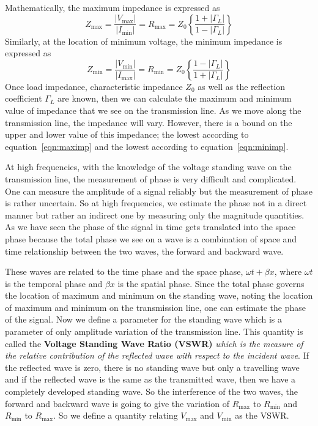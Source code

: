 Mathematically, the maximum impedance is expressed as
\begin{dmath}
Z_{\max} = \frac{|V_{\max}|}{|I_{\min}|} 
= R_{\max}
= Z_0\left\{\frac{1+|\Gamma_L|}{1-|\Gamma_L|}\right\}
\label{eqn:maximp}
\end{dmath}
Similarly, at the location of minimum voltage, the minimum impedance is expressed as
\begin{dmath}
Z_{\min}=\frac{|V_{\min}|}{|I_{\max}|} 
= R_{\min}=Z_0\left\{\frac{1-|\Gamma_L|}{1+|\Gamma_L|} \right\}
\label{eqn:minimp}
\end{dmath}
Once load impedance, characteristic impedance $Z_0$ as well as the reflection coefficient $\Gamma_L$ are known, then we can calculate the maximum and minimum value of impedance that we see on the transmission line. As we move along the transmission line, the impedance will vary. However, there is a bound on the upper and lower value of this impedance; the lowest according to equation~\ref{eqn:maximp} and the lowest according to equation~\ref{eqn:minimp}.

At high frequencies, with the knowledge of the voltage standing wave on the transmission line, the measurement of phase is very difficult and complicated. One can measure the amplitude of a signal reliably but the measurement of phase is rather uncertain. So at high frequencies, we estimate the phase not in a direct manner but rather an indirect one by measuring only the magnitude quantities. As we have seen the phase of the signal in time gets translated into the space phase because the total phase we see on a wave is a combination of space and time relationship between the two waves, the forward and backward wave. 

These waves are related to the time phase and the space phase, $\omega t + \beta x$, where $\omega t$ is the temporal phase and $\beta x$ is the spatial phase. Since the total phase governs the location of maximum and minimum on the standing wave, noting the location of maximum and minimum on the transmission line, one can estimate the phase of the signal. Now we define a parameter for the standing wave which is a parameter of only amplitude variation of the transmission line. This quantity is called the \textbf{Voltage Standing Wave Ratio (VSWR)} \emph{which is the measure of the relative contribution of the reflected wave with respect to the incident wave}. If the reflected wave is zero, there is no standing wave but only a travelling wave and if the reflected wave is the same as the transmitted wave, then we have a completely developed standing wave. So the interference of the two waves, the forward and backward wave is going to give the variation of $R_{\max}$ to $R_{\min}$ and $R_{\min}$ to $R_{\max}$. So we define a quantity relating $V_{\max}$ and $V_{\min}$ as the VSWR.

